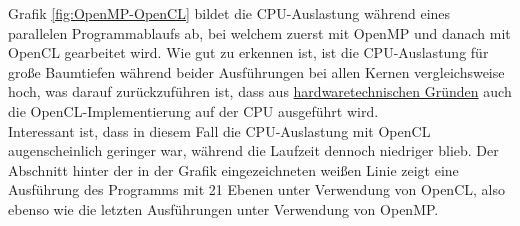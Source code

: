 \noindent
Grafik \ref{fig:OpenMP-OpenCL} bildet die CPU-Auslastung während eines parallelen Programmablaufs ab, bei welchem 
zuerst mit OpenMP und danach mit OpenCL gearbeitet wird. Wie gut zu erkennen ist, ist die CPU-Auslastung für große Baumtiefen während beider Ausführungen bei allen Kernen 
vergleichsweise hoch, was darauf zurückzuführen ist, dass aus \hyperref[Hardware]{hardwaretechnischen Gründen} auch die OpenCL-Implementierung
auf der CPU ausgeführt wird.\\
Interessant ist, dass in diesem Fall die CPU-Auslastung mit OpenCL augenscheinlich geringer war, während die Laufzeit dennoch niedriger
blieb. Der Abschnitt hinter der in der Grafik eingezeichneten weißen Linie zeigt eine Ausführung des Programms mit 21 Ebenen unter 
Verwendung von OpenCL, also ebenso wie die letzten Ausführungen unter Verwendung von OpenMP. \\

